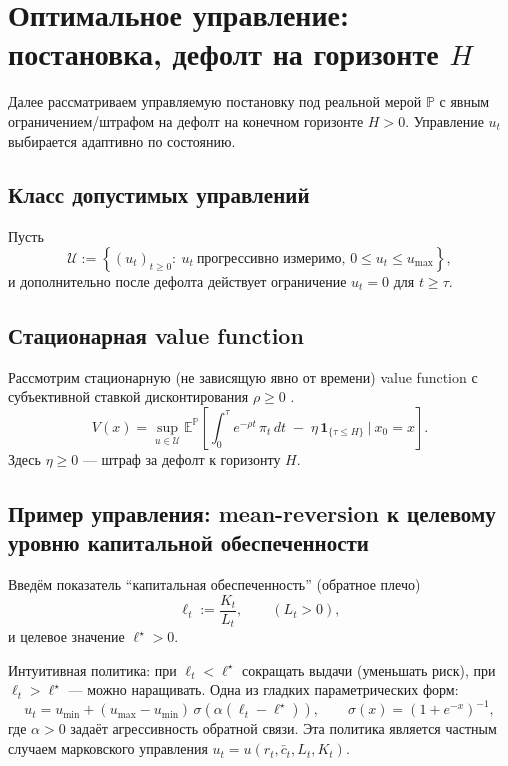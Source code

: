 \documentclass[11pt]{article}
\newcommand{\E}{\mathbb{E}}
\newcommand{\Pp}{\mathbb{P}}
\newcommand{\1}{\mathbf{1}}
\begin{document}
\section{Оптимальное управление: постановка, дефолт на горизонте $H$}
Далее рассматриваем управляемую постановку под реальной мерой $\Pp$ с явным ограничением/штрафом на дефолт на конечном горизонте $H>0$. Управление $u_t$ выбирается адаптивно по состоянию.

\subsection{Класс допустимых управлений}
Пусть
\[
\mathcal{U} := \left\{(u_t)_{t\ge 0}:\ u_t\ \text{прогрессивно измеримо, } 0\le u_t \le u_{\max}\right\},
\]
и дополнительно после дефолта действует ограничение $u_t=0$ для $t\ge\tau$.

\subsection{Стационарная value function}
Рассмотрим стационарную (не зависящую явно от времени) value function с субъективной ставкой дисконтирования $\rho\ge 0$ .
\begin{equation}
V(x)
=
\sup_{u\in\mathcal{U}}
\E^{\Pp}\left[
\int_{0}^{\tau}
e^{-\rho t}\,\pi_t\,dt
\;-\;
\eta\,\1_{\{\tau \le H\}}
\ \Big|\ x_0=x
\right].
\label{eq:value_stationary}
\end{equation}
Здесь $\eta\ge 0$ --- штраф за дефолт к горизонту $H$.

\subsection{Пример управления: mean-reversion к целевому уровню капитальной обеспеченности}
Введём показатель ``капитальная обеспеченность'' (обратное плечо)
\begin{equation}
\ell_t := \frac{K_t}{L_t},\qquad (L_t>0),
\label{eq:ell}
\end{equation}
и целевое значение $\ell^\star>0$.

Интуитивная политика: при $\ell_t<\ell^\star$ сокращать выдачи (уменьшать риск), при $\ell_t>\ell^\star$ --- можно наращивать.
Одна из гладких параметрических форм:
\begin{equation}
u_t
=
u_{\min} + (u_{\max}-u_{\min})\,
\sigma\!\left(\alpha(\ell_t-\ell^\star)\right),
\qquad
\sigma(x)=(1+e^{-x})^{-1},
\label{eq:policy_sigmoid}
\end{equation}
где $\alpha>0$ задаёт агрессивность обратной связи.
Эта политика является частным случаем марковского управления $u_t = u(r_t,\bar c_t,L_t,K_t)$.
\end{document}
